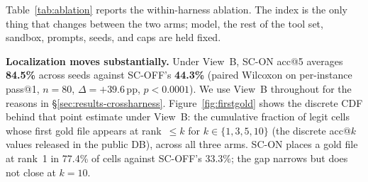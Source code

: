 Table~\ref{tab:ablation} reports the within-harness ablation. The index is the only thing
that changes between the two arms; model, the rest of the tool set, sandbox, prompts,
seeds, and caps are held fixed.

\textbf{Localization moves substantially.} Under View~B, SC-ON acc@5 averages
\textbf{84.5\%} across seeds against SC-OFF's \textbf{44.3\%} (paired Wilcoxon on
per-instance pass@1, $n=80$, $\Delta=+39.6$\,pp, $p<0.0001$). We use View~B throughout
for the reasons in \S\ref{sec:results-crossharness}. Figure~\ref{fig:firstgold} shows the
discrete CDF behind that point estimate under View~B: the cumulative fraction of legit
cells whose first gold file appears at rank~$\le k$ for $k\in\{1,3,5,10\}$ (the discrete
acc@$k$ values released in the public DB), across all three arms. SC-ON places a gold
file at rank~1 in 77.4\% of cells against SC-OFF's 33.3\%; the gap narrows but does not
close at $k=10$.


